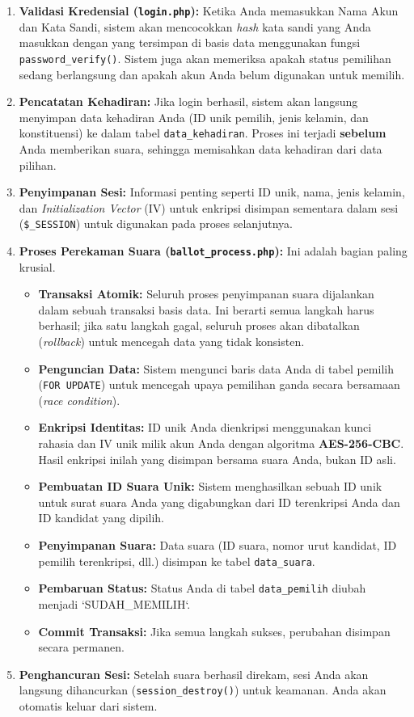 \begin{enumerate}
	\item \textbf{Validasi Kredensial (\texttt{login.php}):} Ketika Anda memasukkan Nama Akun dan Kata Sandi, sistem akan mencocokkan \textit{hash} kata sandi yang Anda masukkan dengan yang tersimpan di basis data menggunakan fungsi \texttt{password\_verify()}. Sistem juga akan memeriksa apakah status pemilihan sedang berlangsung dan apakah akun Anda belum digunakan untuk memilih.
	\item \textbf{Pencatatan Kehadiran:} Jika login berhasil, sistem akan langsung menyimpan data kehadiran Anda (ID unik pemilih, jenis kelamin, dan konstituensi) ke dalam tabel \texttt{data\_kehadiran}. Proses ini terjadi \textbf{sebelum} Anda memberikan suara, sehingga memisahkan data kehadiran dari data pilihan.
	\item \textbf{Penyimpanan Sesi:} Informasi penting seperti ID unik, nama, jenis kelamin, dan \textit{Initialization Vector} (IV) untuk enkripsi disimpan sementara dalam sesi (\texttt{\$\_SESSION}) untuk digunakan pada proses selanjutnya.
	\item \textbf{Proses Perekaman Suara (\texttt{ballot\_process.php}):} Ini adalah bagian paling krusial.
	\begin{itemize}
		\item \textbf{Transaksi Atomik:} Seluruh proses penyimpanan suara dijalankan dalam sebuah transaksi basis data. Ini berarti semua langkah harus berhasil; jika satu langkah gagal, seluruh proses akan dibatalkan (\textit{rollback}) untuk mencegah data yang tidak konsisten.
		\item \textbf{Penguncian Data:} Sistem mengunci baris data Anda di tabel pemilih (\texttt{FOR UPDATE}) untuk mencegah upaya pemilihan ganda secara bersamaan (\textit{race condition}).
		\item \textbf{Enkripsi Identitas:} ID unik Anda dienkripsi menggunakan kunci rahasia dan IV unik milik akun Anda dengan algoritma \textbf{AES-256-CBC}. Hasil enkripsi inilah yang disimpan bersama suara Anda, bukan ID asli.
		\item \textbf{Pembuatan ID Suara Unik:} Sistem menghasilkan sebuah ID unik untuk surat suara Anda yang digabungkan dari ID terenkripsi Anda dan ID kandidat yang dipilih.
		\item \textbf{Penyimpanan Suara:} Data suara (ID suara, nomor urut kandidat, ID pemilih terenkripsi, dll.) disimpan ke tabel \texttt{data\_suara}.
		\item \textbf{Pembaruan Status:} Status Anda di tabel \texttt{data\_pemilih} diubah menjadi `SUDAH\_MEMILIH`.
		\item \textbf{Commit Transaksi:} Jika semua langkah sukses, perubahan disimpan secara permanen.
	\end{itemize}
	\item \textbf{Penghancuran Sesi:} Setelah suara berhasil direkam, sesi Anda akan langsung dihancurkan (\texttt{session\_destroy()}) untuk keamanan. Anda akan otomatis keluar dari sistem.
\end{enumerate}

